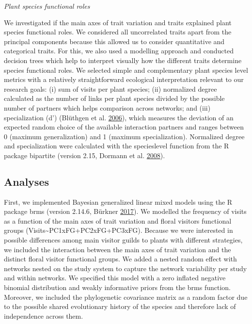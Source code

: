 \documentclass[12pt,a4paper,]{article}
\begin{document}
\emph{Plant species functional roles}

We investigated if the main axes of trait variation and traits explained
plant species functional roles. We considered all uncorrelated traits
apart from the principal components because this allowed us to consider
quantitative and categorical traits. For this, we also used a modelling
approach and conducted decision trees which help to interpret visually
how the different traits determine species functional roles. We selected
simple and complementary plant species level metrics with a relatively
straightforward ecological interpretation relevant to our research
goals: (i) sum of visits per plant species; (ii) normalized degree
calculated as the number of links per plant species divided by the
possible number of partners which helps comparison across networks; and
(iii) specialization (d') (Blüthgen et al.
\protect\hyperlink{ref-bluthgen2006}{2006}), which measures the
deviation of an expected random choice of the available interaction
partners and ranges between 0 (maximum generalization) and 1 (maximum
specialization). Normalized degree and specialization were calculated
with the specieslevel function from the R package bipartite (version
2.15, Dormann et al. \protect\hyperlink{ref-dormann2008}{2008}).

\subsection{Analyses}\label{analyses}

First, we implemented Bayesian generalized linear mixed models using the
R package brms (version 2.14.6, Bürkner
\protect\hyperlink{ref-burkner2017}{2017}). We modelled the frequency of
visits as a function of the main axes of trait variation and floral
visitors functional groups
(Visits\textasciitilde{}PC1xFG+PC2xFG+PC3xFG). Because we were
interested in possible differences among main visitor guilds to plants
with different strategies, we included the interaction between the main
axes of trait variation and the distinct floral visitor functional
groups. We added a nested random effect with networks nested on the
study system to capture the network variability per study and within
networks. We specified this model with a zero inflated negative binomial
distribution and weakly informative priors from the brms function.
Moreover, we included the phylogenetic covariance matrix as a random
factor due to the possible shared evolutionary history of the species
and therefore lack of independence across them.
\end{document}
